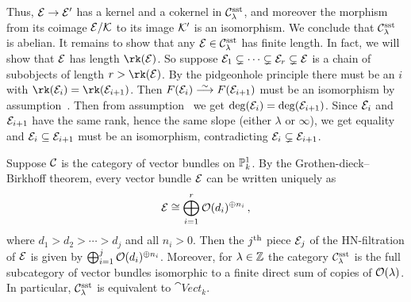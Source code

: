 \documentclass[a4paper, 10pt, oneside, DIV=9, chapterprefix=true, numbers=enddot,bibliography=totoc]{scrbook}
\begin{document}
\begin{proof*}
	Thus, $\Ee\morphism \Ee'$ has a kernel and a cokernel in $\mathcal{C}_\lambda^{\mathrm{sst}}$, and moreover the morphism from its coimage $\mathcal{E}/\mathcal{K}$ to its image $\mathcal{K}'$ is an isomorphism. We conclude that $\mathcal{C}_\lambda^{\mathrm{sst}}$ is abelian. It remains to show that any $\mathcal{E}\in \mathcal{C}_\lambda^{\mathrm{sst}}$ has finite length. In fact, we will show that $\mathcal{E}$ has length $\rk(\Ee)$. So suppose $\mathcal{E}_1\subsetneq \dotsb\subsetneq \mathcal{E}_r\subsetneq \mathcal{E}$ is a chain of subobjects of length $r>\rk(\Ee)$. By the pidgeonhole principle there must be an $i$ with $\rk(\Ee_i)=\rk(\Ee_{i+1})$. Then $F(\Ee_i)\isomorphism F(\Ee_{i+1})$ must be an isomorphism by assumption~. Then from assumption~ we get $\deg(\mathcal{E}_i)=\deg(\mathcal{E}_{i+1})$. Since $\mathcal{E}_i$ and $\mathcal{E}_{i+1}$ have the same rank, hence the same slope (either $\lambda$ or $\infty$), we get equality and $\mathcal{E}_i\subseteq \mathcal{E}_{i+1}$ must be an isomorphism, contradicting $\mathcal{E}_i\subsetneq \mathcal{E}_{i+1}$.
\end{proof*}
\begin{exm}
	Suppose $\mathcal{C}$ is the category of vector bundles on $\mathbb{P}_k^1$. By the Grothen-dieck--Birkhoff theorem, every vector bundle $\mathcal{E}$ can be written uniquely as
	\begin{equation*}
		\mathcal{E}\cong \bigoplus_{i=1}^r\mathcal{O}(d_i)^{\oplus n_i}\,,
	\end{equation*}
	where $d_1>d_2>\dotsb >d_j$ and all $n_i>0$. Then the $j^{\text{th}}$ piece $\mathcal{E}_j$ of the HN-filtration of $\mathcal{E}$ is given by $\bigoplus_{i=1}^j\mathcal{O}(d_i)^{\oplus n_i}$. Moreover, for $\lambda\in \mathbb{Z}$ the category $\mathcal{C}_\lambda^{\mathrm{sst}}$ is the full subcategory of vector bundles isomorphic to a finite direct sum of copies of $\mathcal{O}(\lambda)$. In particular, $\mathcal{C}_\lambda^{\mathrm{sst}}$ is equivalent to $\cat{Vect}_k$.
\end{exm}
\end{document}
